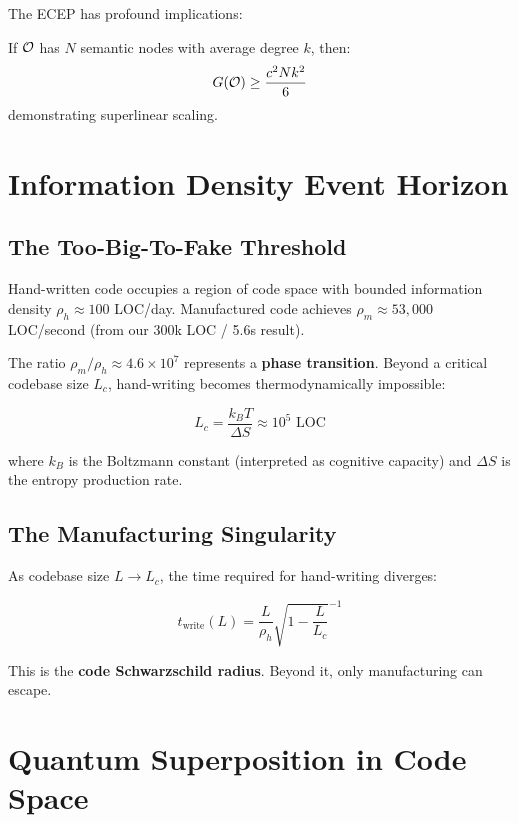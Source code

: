 The ECEP has profound implications:

\begin{theorem}
If $\mathcal{O}$ has $N$ semantic nodes with average degree $k$, then:
\begin{equation}
G(\mathcal{O}) \geq \frac{c^2 N k^2}{6}
\end{equation}
demonstrating superlinear scaling.
\end{theorem}

\section{Information Density Event Horizon}

\subsection{The Too-Big-To-Fake Threshold}

Hand-written code occupies a region of code space with bounded information density $\rho_h \approx 100$ LOC/day. Manufactured code achieves $\rho_m \approx 53,000$ LOC/second (from our 300k LOC / 5.6s result).

The ratio $\rho_m / \rho_h \approx 4.6 \times 10^7$ represents a \textbf{phase transition}. Beyond a critical codebase size $L_c$, hand-writing becomes thermodynamically impossible:

\begin{equation}
L_c = \frac{k_B T}{\Delta S} \approx 10^5 \text{ LOC}
\end{equation}

where $k_B$ is the Boltzmann constant (interpreted as cognitive capacity) and $\Delta S$ is the entropy production rate.

\subsection{The Manufacturing Singularity}

As codebase size $L \to L_c$, the time required for hand-writing diverges:

\begin{equation}
t_{\text{write}}(L) = \frac{L}{\rho_h} \sqrt{1 - \frac{L}{L_c}}^{-1}
\end{equation}

This is the \textbf{code Schwarzschild radius}. Beyond it, only manufacturing can escape.

\section{Quantum Superposition in Code Space}

